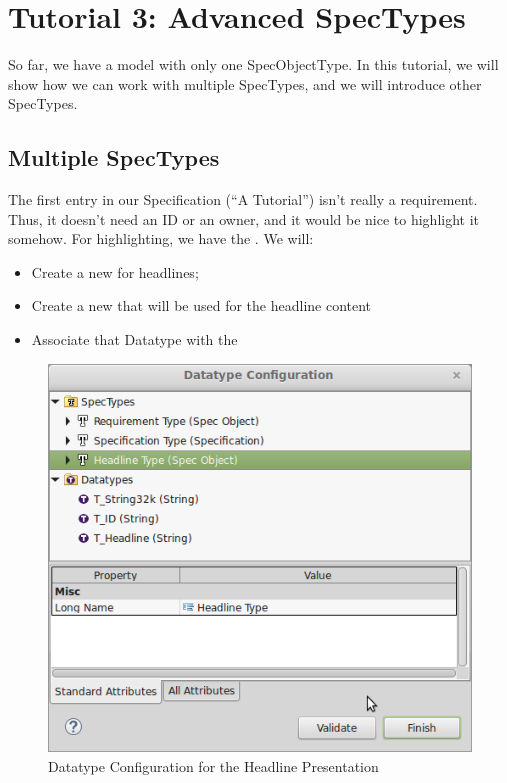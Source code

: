 \section{Tutorial 3: Advanced SpecTypes}

So far, we have a model with only one SpecObjectType.  In this tutorial, we will show how we can work with multiple SpecTypes, and we will introduce other SpecTypes.

\subsection{Multiple SpecTypes}

The first entry in our Specification (``A \pror{} Tutorial'') isn't really a requirement.  Thus, it doesn't need an ID or an owner, and it would be nice to highlight it somehow.  For highlighting, we have the .  We will:

\begin{itemize}

\item
  Create a new  for headlines;
\item
  Create a new  that will be used for the headline content
\item
  Associate that Datatype with the 
\end{itemize}

\begin{figure}
\centering      
\includegraphics[width=0.8\linewidth]{../rmf-images/datatype_Headline_desc.png}      
\caption{Datatype Configuration for the Headline Presentation}      
\label{fig:headlineConfig}
\end{figure}

